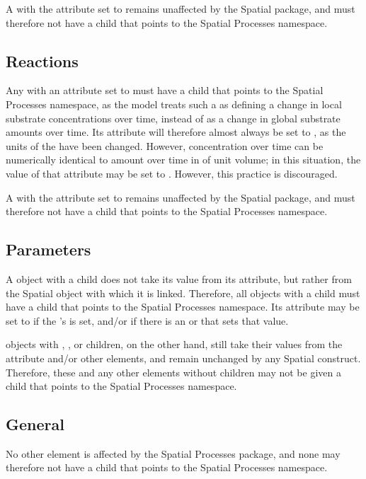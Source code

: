 A \Species with the  attribute set to  remains unaffected by the Spatial package, and must therefore not have a \ChangedMath child that points to the Spatial Processes namespace.

\subsection{Reactions}
Any \Reaction with an  attribute set to  must have a \ChangedMath child that points to the Spatial Processes namespace, as the model treats such a \Reaction as defining a change in local substrate concentrations over time, instead of as a change in global substrate amounts over time.  Its  attribute will therefore almost always be set to , as the units of the \KineticLaw have been changed.  However, concentration over time can be numerically identical to amount over time in \Compartments of unit volume; in this situation, the value of that attribute may be set to .  However, this practice is discouraged.

A \Reaction with the  attribute set to  remains unaffected by the Spatial package, and must therefore not have a \ChangedMath child that points to the Spatial Processes namespace.

\subsection{Parameters}
A \Parameter object with a \SpatialSymbolReference child does not take its value from its  attribute, but rather from the Spatial object with which it is linked.  Therefore, all \Parameter objects with a \SpatialSymbolReference child must have a \ChangedMath child that points to the Spatial Processes namespace.  Its  attribute may be set to  if the \Parameter's  is set, and/or if there is an \InitialAssignment or \Rule that sets that value.

\Parameter objects with \DiffusionCoefficient, \AdvectionCoefficient, or \BoundaryCondition children, on the other hand, still take their values from the  attribute and/or other \sbmlthreecore elements, and remain unchanged by any Spatial construct.  Therefore, these and any other \Parameter elements without \SpatialSymbolReference children may not be given a \ChangedMath child that points to the Spatial Processes namespace.

\subsection{General}
No other \sbmlthreecore element is affected by the Spatial Processes package, and none may therefore not have a \ChangedMath child that points to the Spatial Processes namespace.

